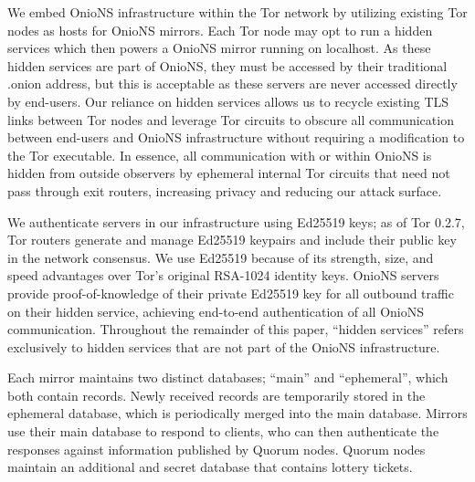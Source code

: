 \documentclass[USenglish,oneside,twocolumn]{article}
\begin{document}
We embed OnioNS infrastructure within the Tor network by utilizing existing Tor nodes as hosts for OnioNS mirrors. Each Tor node may opt to run a hidden services which then powers a OnioNS mirror running on localhost. As these hidden services are part of OnioNS, they must be accessed by their traditional .onion address, but this is acceptable as these servers are never accessed directly by end-users. Our reliance on hidden services allows us to recycle existing TLS links between Tor nodes and leverage Tor circuits to obscure all communication between end-users and OnioNS infrastructure without requiring a modification to the Tor executable. In essence, all communication with or within OnioNS is hidden from outside observers by ephemeral internal Tor circuits that need not pass through exit routers, increasing privacy and reducing our attack surface.

We authenticate servers in our infrastructure using Ed25519 \cite{bernstein2012high} keys; as of Tor 0.2.7, Tor routers generate and manage Ed25519 keypairs and include their public key in the network consensus. We use Ed25519 because of its strength, size, and speed advantages over Tor's original RSA-1024 identity keys. OnioNS servers provide proof-of-knowledge of their private Ed25519 key for all outbound traffic on their hidden service, achieving end-to-end authentication of all OnioNS communication. Throughout the remainder of this paper, ``hidden services'' refers exclusively to hidden services that are not part of the OnioNS infrastructure.

Each mirror maintains two distinct databases; ``main'' and ``ephemeral'', which both contain records. Newly received records are temporarily stored in the ephemeral database, which is periodically merged into the main database. Mirrors use their main database to respond to clients, who can then authenticate the responses against information published by Quorum nodes. Quorum nodes maintain an additional and secret database that contains lottery tickets.


\end{document}
